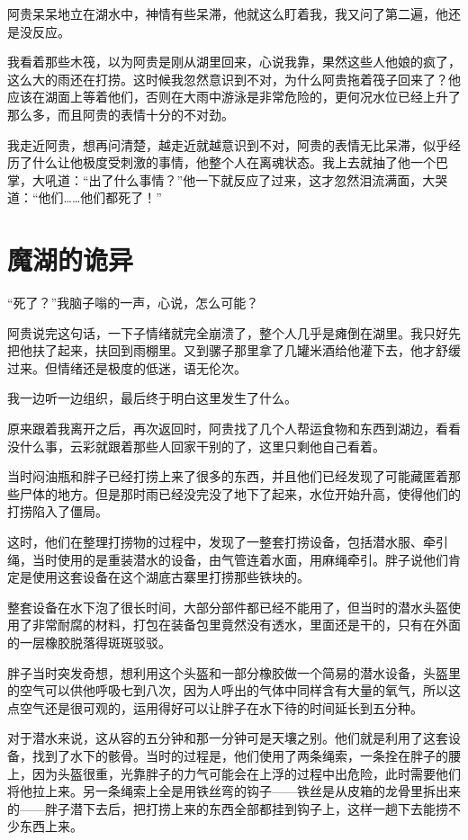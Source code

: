 阿贵呆呆地立在湖水中，神情有些呆滞，他就这么盯着我，我又问了第二遍，他还是没反应。

我看着那些木筏，以为阿贵是刚从湖里回来，心说我靠，果然这些人他娘的疯了，这么大的雨还在打捞。这时候我忽然意识到不对，为什么阿贵拖着筏子回来了？他应该在湖面上等着他们，否则在大雨中游泳是非常危险的，更何况水位已经上升了那么多，而且阿贵的表情十分的不对劲。

我走近阿贵，想再问清楚，越走近就越意识到不对，阿贵的表情无比呆滞，似乎经历了什么让他极度受刺激的事情，他整个人在离魂状态。我上去就抽了他一个巴掌，大吼道：“出了什么事情？”他一下就反应了过来，这才忽然泪流满面，大哭道：“他们……他们都死了！”

\chapter{魔湖的诡异}

“死了？”我脑子嗡的一声，心说，怎么可能？

阿贵说完这句话，一下子情绪就完全崩溃了，整个人几乎是瘫倒在湖里。我只好先把他扶了起来，扶回到雨棚里。又到骡子那里拿了几罐米酒给他灌下去，他才舒缓过来。但情绪还是极度的低迷，语无伦次。

我一边听一边组织，最后终于明白这里发生了什么。

原来跟着我离开之后，再次返回时，阿贵找了几个人帮运食物和东西到湖边，看看没什么事，云彩就跟着那些人回家干别的了，这里只剩他自己看着。

当时闷油瓶和胖子已经打捞上来了很多的东西，并且他们已经发现了可能藏匿着那些尸体的地方。但是那时雨已经没完没了地下了起来，水位开始升高，使得他们的打捞陷入了僵局。

这时，他们在整理打捞物的过程中，发现了一整套打捞设备，包括潜水服、牵引绳，当时使用的是重装潜水的设备，由气管连着水面，用麻绳牵引。胖子说他们肯定是使用这套设备在这个湖底古寨里打捞那些铁块的。

整套设备在水下泡了很长时间，大部分部件都已经不能用了，但当时的潜水头盔使用了非常耐腐的材料，打包在装备包里竟然没有透水，里面还是干的，只有在外面的一层橡胶脱落得斑斑驳驳。

胖子当时突发奇想，想利用这个头盔和一部分橡胶做一个简易的潜水设备，头盔里的空气可以供他呼吸七到八次，因为人呼出的气体中同样含有大量的氧气，所以这点空气还是很可观的，运用得好可以让胖子在水下待的时间延长到五分种。

对于潜水来说，这从容的五分钟和那一分钟可是天壤之别。他们就是利用了这套设备，找到了水下的骸骨。当时的过程是，他们使用了两条绳索，一条拴在胖子的腰上，因为头盔很重，光靠胖子的力气可能会在上浮的过程中出危险，此时需要他们将他拉上来。另一条绳索上全是用铁丝弯的钩子——铁丝是从皮箱的龙骨里拆出来的——胖子潜下去后，把打捞上来的东西全部都挂到钩子上，这样一趟下去能捞不少东西上来。

